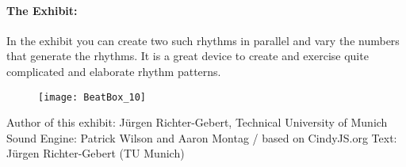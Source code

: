 \paragraph{The Exhibit:} In the exhibit you can create two such rhythms in parallel and vary the numbers that generate the rhythms. It is a great device to create and exercise quite complicated and elaborate rhythm patterns.  

\begin{figure}[h]
\centering
\texttt{[image: BeatBox\_10]}
\end{figure}

\vfill

Author of this exhibit: Jürgen Richter-Gebert, Technical University of Munich 
Sound Engine: Patrick Wilson and Aaron Montag / based on CindyJS.org
Text: Jürgen Richter-Gebert (TU Munich)



